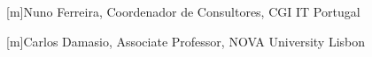 


[m]{Nuno Ferreira, Coordenador de Consultores, CGI IT Portugal}


[m]{Carlos Damasio, Associate Professor, NOVA University Lisbon}


